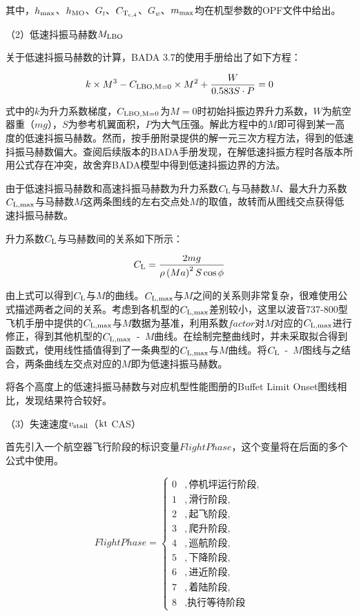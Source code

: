 \documentclass[a4paper,punct,space,heading=true,AutoFakeBold]{ctexrep}
\begin{document}
其中，$h_{\rm max}$、$h_{\rm MO}$、$G_t$、$C_{\rm T_{c,4}}$、$G_w$、$m_{\rm max}$均在机型参数的OPF文件中给出。

（2）低速抖振马赫数$M_{\rm LBO}$

关于低速抖振马赫数的计算，BADA 3.7的使用手册给出了如下方程：

\begin{equation*}
k\times M^3-C_{\rm LBO,M=0}\times M^2+\frac{W}{0.583 S\cdot P}=0
\end{equation*}

式中的$k$为升力系数梯度，$C_{\rm LBO,M=0}$为$M=0$时初始抖振边界升力系数，$W$为航空器重（$mg$），$S$为参考机翼面积，$P$为大气压强。解此方程中的$M$即可得到某一高度的低速抖振马赫数。然而，按手册附录提供的解一元三次方程方法，得到的低速抖振马赫数偏大。查阅后续版本的BADA手册发现，在解低速抖振方程时各版本所用公式存在冲突，故舍弃BADA模型中得到低速抖振边界的方法。

由于低速抖振马赫数和高速抖振马赫数为升力系数$C_{\rm L}$与马赫数$M$、最大升力系数$C_{\rm L,max}$与马赫数$M$这两条图线的左右交点处$M$的取值，故转而从图线交点获得低速抖振马赫数。

升力系数$C_{\rm L}$与马赫数间的关系如下所示：

\begin{equation}\label{CL-M}
C_{\rm L}=\frac{2mg}{\rho \left(M a\right)^2 S \cos\phi}
\end{equation}

由上式可以得到$C_{\rm L}$与$M$的曲线。$C_{\rm L,max}$与$M$之间的关系则非常复杂，很难使用公式描述两者之间的关系。考虑到各机型的$C_{\rm L,max}$差别较小，这里以波音737-800型飞机手册中提供的$C_{\rm L,max}$与$M$数据为基准，利用系数$factor$对$M$对应的$C_{\rm L,max}$进行修正，得到其他机型的$C_{\rm L,max}$\ -\ $M$曲线。在绘制完整曲线时，并未采取拟合得到函数式，使用线性插值得到了一条典型的$C_{\rm L,max}$与$M$曲线。将$C_{\rm L}$\ -\ $M$图线与之结合，两条曲线左交点对应的$M$即为低速抖振马赫数。

将各个高度上的低速抖振马赫数与对应机型性能图册的Buffet Limit Onset图线相比，发现结果符合较好。

（3）失速速度$v_{\rm stall}$（$\rm kt$ CAS）

首先引入一个航空器飞行阶段的标识变量$FlightPhase$，这个变量将在后面的多个公式中使用。

\begin{equation*}
FlightPhase=\left\{\begin{array}{ll}
0   &   , \text{停机坪运行阶段},\\
1   &   , \text{滑行阶段},\\
2   &   , \text{起飞阶段},\\
3   &   , \text{爬升阶段},\\
4   &   , \text{巡航阶段},\\
5   &   , \text{下降阶段},\\
6   &   , \text{进近阶段},\\
7   &   , \text{着陆阶段},\\
8   &   , \text{执行等待阶段}
\end{array}\right.
\end{equation*}
\end{document}
